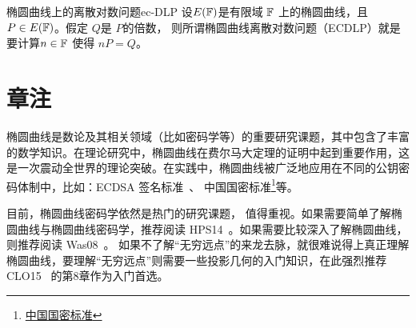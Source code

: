 \begin{center}
	
\end{center}

\begin{definition}{椭圆曲线上的离散对数问题}{ec-DLP}
设$E({\mathbb F})$是有限域 ${\mathbb F}$ 上的椭圆曲线，且$P \in E({\mathbb F})$。假定 $Q$是 $P$的倍数，
则所谓椭圆曲线离散对数问题（ECDLP）就是要计算$n\in {\mathbb F}$ 使得 $nP = Q$。
\end{definition}

 \section*{章注}
 椭圆曲线是数论及其相关领域（比如密码学等）的重要研究课题，其中包含了丰富的数学知识。在理论研究中，椭圆曲线在费尔马大定理的证明中起到重要作用，这是一次震动全世界的理论突破。在实践中，椭圆曲线被广泛地应用在不同的公钥密码体制中，比如：ECDSA 签名标准~\cite{DSS13}、
 中国国密标准\footnote{\href{https://github.com/guanzhi/GM-Standards}{中国国密标准}}等。
 
 目前，椭圆曲线密码学依然是热门的研究课题，
 值得重视。如果需要简单了解椭圆曲线与椭圆曲线密码学，推荐阅读 HPS14~\cite{HPS14}。如果需要比较深入了解椭圆曲线，则推荐阅读 Was08~\cite{Was08}。
 如果不了解“无穷远点”的来龙去脉，就很难说得上真正理解椭圆曲线，要理解“无穷远点”则需要一些投影几何的入门知识，在此强烈推荐 CLO15~\cite{CLO15}
 的第8章作为入门首选。
 
